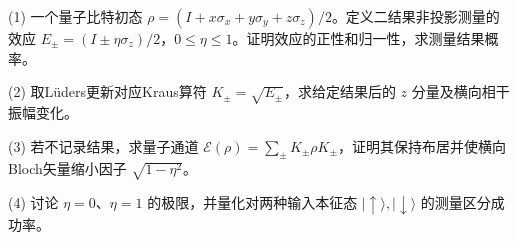 (1) 一个量子比特初态 \(\rho=(I+x\sigma_x+y\sigma_y+z\sigma_z)/2\)。定义二结果非投影测量的效应 \(E_\pm=(I\pm\eta\sigma_z)/2\)，\(0\le\eta\le1\)。证明效应的正性和归一性，求测量结果概率。

(2) 取Lüders更新对应Kraus算符 \(K_\pm=\sqrt{E_\pm}\)，求给定结果后的 \(z\) 分量及横向相干振幅变化。

(3) 若不记录结果，求量子通道 \(\mathcal E(\rho)=\sum_\pm K_\pm\rho K_\pm\)，证明其保持布居并使横向Bloch矢量缩小因子 \(\sqrt{1-\eta^2}\)。

(4) 讨论 \(\eta=0\)、\(\eta=1\) 的极限，并量化对两种输入本征态 \(|\uparrow\rangle,|\downarrow\rangle\) 的测量区分成功率。
